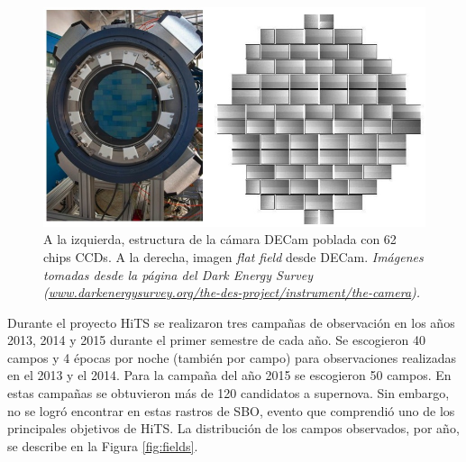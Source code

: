 \begin{figure}[h!]
\centering
\includegraphics[scale=.5]{images/CCDs.jpg}
\caption{A la izquierda, estructura de la c\'amara DECam poblada con 62 chips CCDs. A la derecha, imagen \textit{flat field} desde DECam. \textit{Im\'agenes tomadas desde la p\'agina del Dark Energy Survey (\url{www.darkenergysurvey.org/the-des-project/instrument/the-camera}).}}
\label{fig:f3}
\end{figure}

Durante el proyecto HiTS se realizaron tres campa\~nas de observaci\'on en los a\~nos 2013, 2014 y 2015 durante el primer semestre de cada a\~no. Se escogieron 40 campos y 4 \'epocas por noche (tambi\'en por campo) para observaciones realizadas en el 2013 y el 2014. Para la campa\~na del a\~no 2015 se escogieron 50 campos. En estas campa\~nas se obtuvieron m\'as de 120 candidatos a supernova. Sin embargo, no se logr\'o encontrar en estas rastros de SBO, evento que comprendi\'o uno de los principales objetivos de HiTS. La distribuci\'on de los campos observados, por a\~no, se describe en la Figura \ref{fig:fields}. 

